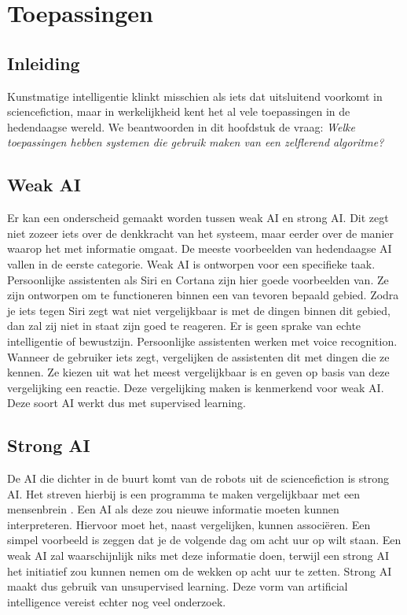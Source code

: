 \section{Toepassingen}

\subsection{Inleiding}
Kunstmatige intelligentie klinkt misschien als iets dat uitsluitend voorkomt in sciencefiction, maar in werkelijkheid kent het al vele toepassingen in de hedendaagse wereld. We beantwoorden in dit hoofdstuk de vraag: \textit{Welke toepassingen hebben systemen die gebruik maken van een zelflerend algoritme?}

\subsection{Weak AI}
Er kan een onderscheid gemaakt worden tussen weak AI en strong AI. Dit zegt niet zozeer iets over de denkkracht van het systeem, maar eerder over de manier waarop het met informatie omgaat.
De meeste voorbeelden van hedendaagse AI vallen in de eerste categorie. Weak AI is ontworpen voor een specifieke taak. Persoonlijke assistenten als Siri en Cortana zijn hier goede voorbeelden van. Ze zijn ontworpen om te functioneren binnen een van tevoren bepaald gebied. Zodra je iets tegen Siri zegt wat niet vergelijkbaar is met de dingen binnen dit gebied, dan zal zij niet in staat zijn goed te reageren. Er is geen sprake van echte intelligentie of bewustzijn.
Persoonlijke assistenten werken met voice recognition. Wanneer de gebruiker iets zegt, vergelijken de assistenten dit met dingen die ze kennen. Ze kiezen uit wat het meest vergelijkbaar is en geven op basis van deze vergelijking een reactie. Deze vergelijking maken is kenmerkend voor weak AI. Deze soort AI werkt dus met supervised learning.

\subsection{Strong AI}
De AI die dichter in de buurt komt van de robots uit de sciencefiction is strong AI. Het streven hierbij is een programma te maken vergelijkbaar met een mensenbrein \cite{Searle}. Een AI als deze zou nieuwe informatie moeten kunnen interpreteren. Hiervoor moet het, naast vergelijken, kunnen associ\"{e}ren. Een simpel voorbeeld is zeggen dat je de volgende dag om acht uur op wilt staan. Een weak AI zal waarschijnlijk niks met deze informatie doen, terwijl een strong AI het initiatief zou kunnen nemen om de wekken op acht uur te zetten. Strong AI maakt dus gebruik van unsupervised learning.
Deze vorm van artificial intelligence vereist echter nog veel onderzoek.

